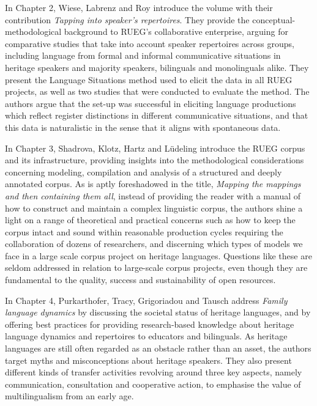\documentclass[output=paper,colorlinks,citecolor=brown]{langscibook}
\begin{document}
In Chapter 2, Wiese, Labrenz and Roy introduce the volume with their contribution \textit{Tapping into speaker's repertoires}. They provide the conceptual\hyp methodological background to RUEG’s collaborative enterprise, arguing for comparative studies that take into account speaker repertoires across groups, including language from formal and informal communicative situations in heritage speakers and majority speakers, bilinguals and monolinguals alike. They present the Language Situations method used to elicit the data in all RUEG projects, as well as two studies that were conducted to evaluate the method. The authors argue that the set-up was successful in eliciting language productions which reflect register distinctions in different communicative situations, and that this data is naturalistic in the sense that it aligns with spontaneous data.

In Chapter 3, Shadrova, Klotz, Hartz and Lüdeling introduce the RUEG corpus and its infrastructure, providing insights into the methodological considerations concerning modeling, compilation and analysis of a structured and deeply annotated corpus. As is aptly foreshadowed in the title, \textit{Mapping the mappings and then containing them all}, instead of providing the reader with a manual of how to construct and maintain a complex linguistic corpus, the authors shine a light on a range of theoretical and practical concerns such as how to keep the corpus intact and sound within reasonable production cycles requiring the collaboration of dozens of researchers, and discerning which types of models we face in a large scale corpus project on heritage languages. Questions like these are seldom addressed in relation to large-scale corpus projects, even though they are fundamental to the quality, success and sustainability of open resources.

In Chapter 4, Purkarthofer, Tracy, Grigoriadou and Tausch address \textit{Family language dynamics} by discussing the societal status of heritage languages, and by offering best practices for providing research-based knowledge about heritage language dynamics and repertoires to educators and bilinguals. As heritage languages are still often regarded as an obstacle rather than an asset, the authors target myths and misconceptions about heritage speakers. They also present different kinds of transfer activities revolving around three key aspects, namely communication, consultation and cooperative action, to emphasise the value of multilingualism from an early age.
\end{document}
